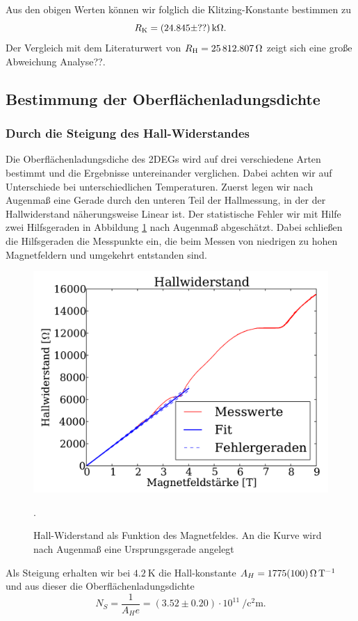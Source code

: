 \documentclass[paper=a4,fontsize=10pt,DIV=18,twocolumn,parskip=half]{scrartcl}
\numberwithin{equation}{section}    %
\renewcommand{\note}[1]{{\color{red}#1??}}
\begin{document}
Aus den obigen Werten können wir folglich die Klitzing-Konstante bestimmen zu
\begin{equation}
	R_{\rm K} = (24.845 \pm ??)\,\SI{}{\kilo\ohm}.
\end{equation}
Der Vergleich mit dem Literaturwert von $R_{\rm H} = \SI{25812.807}{\ohm}$ zeigt sich eine große Abweichung \note{Analyse}.

\subsection{Bestimmung der Oberflächenladungsdichte}
\subsubsection*{Durch die Steigung des Hall-Widerstandes}
Die Oberflächenladungsdiche des 2DEGs wird auf drei verschiedene Arten bestimmt und die Ergebnisse untereinander verglichen. Dabei achten wir auf Unterschiede bei unterschiedlichen Temperaturen. Zuerst legen wir nach Augenmaß eine Gerade durch den unteren Teil der Hallmessung, in der der Hallwiderstand näherungsweise Linear ist. Der statistische Fehler wir mit Hilfe zwei Hilfsgeraden in Abbildung \ref{hallsteigung} nach Augenmaß abgeschätzt. Dabei schließen die Hilfsgeraden die Messpunkte ein, die beim Messen von niedrigen zu hohen Magnetfeldern und umgekehrt entstanden sind. 
\begin{figure}[htp]
	\begin{center}
		\includegraphics[width=\columnwidth]{Data-Plots/02-Hallsteigung.pdf}
		\caption{Hall-Widerstand als Funktion des Magnetfeldes. An die Kurve wird nach Augenmaß eine Ursprungsgerade angelegt}.
		\label{hallsteigung}
	\end{center}
\end{figure}
Als Steigung erhalten wir bei $\SI{4.2}{\kelvin}$ die Hall-konstante $A_H=\SI{1775+-100}{\ohm\per\tesla}$ und aus dieser die Oberflächenladungsdichte
\begin{equation}
N_S=\frac{1}{A_H e} = (3.52 \pm 0.20) \cdot 10^{11}\SI{}{\per\square\centi\meter}.
\label{ns1}
\end{equation}
\end{document}
